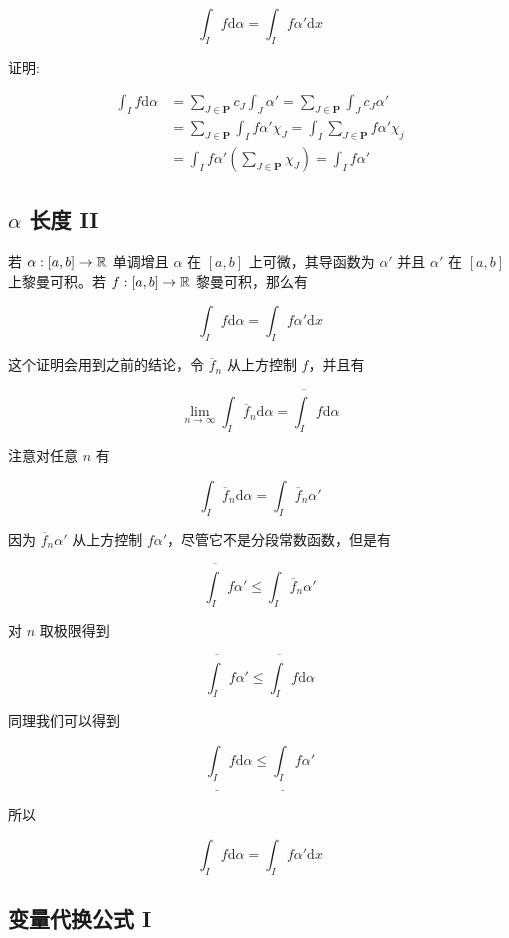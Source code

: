 \[
\int_{I}f \mathrm{d} \alpha = \int_{I}f \alpha' \mathrm{d}x
\]

证明:

\begin{align*}
    \int_{I}f \mathrm{d} \alpha & = \sum_{J \in \mathbf{P}}c_J \int_{J} \alpha' = \sum_{J \in \mathbf{P}}\int_{J} c_J\alpha' \\
    &= \sum_{J \in \mathbf{P}}\int_{I}f\alpha'\chi_{J} = \int_{I}\sum_{J \in \mathbf{P}}f \alpha' \chi_j \\
    & = \int_{I}f\alpha'(\sum_{J \in \mathbf{P}}\chi_J) = \int_{I}f \alpha'
\end{align*}


\subsection{$\alpha$ 长度 II}

若 $\alpha: [a,b] \to \mathbb{R}$ 单调增且 $\alpha$ 在 $[a,b]$ 上可微，其导函数为 $\alpha'$ 并且 $\alpha'$
在 $[a,b]$ 上黎曼可积。若 $f: [a,b ] \to \mathbb{R}$ 黎曼可积，那么有

\[
\int_{I}f \mathrm{d} \alpha = \int_{I}f \alpha' \mathrm{d}x
\]

这个证明会用到之前的结论，令 $\overline{f}_n$ 从上方控制 $f$，并且有

\[
\lim_{n \to \infty}\int_{I}\overline{f}_n \mathrm{d} \alpha = \overline{\int_{I}}f \mathrm{d} \alpha
\]

注意对任意 $n$ 有

\[
\int_{I}\overline{f}_n \mathrm{d} \alpha = \int_{I}\overline{f}_n \alpha'
\]

因为 $\overline{f}_n \alpha'$ 从上方控制 $f\alpha'$，尽管它不是分段常数函数，但是有

\[
\overline{\int_I}f \alpha' \le \int_{I}\overline{f}_n \alpha'
\]

对 $n$ 取极限得到

\[
\overline{\int_I}f \alpha' \le \overline{\int_I} f \mathrm{d} \alpha
\]

同理我们可以得到

\[
\underline{\int_I} f \mathrm{d} \alpha \le \underline{\int_I}f \alpha' 
\]

所以

\[
\int_{I}f \mathrm{d} \alpha = \int_{I}f \alpha' \mathrm{d}x
\]

\subsection{变量代换公式 I}

